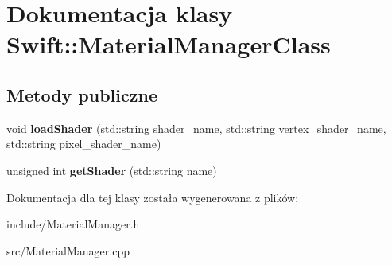 \hypertarget{class_swift_1_1_material_manager_class}{\section{Dokumentacja klasy Swift\-:\-:Material\-Manager\-Class}
\label{class_swift_1_1_material_manager_class}
}
\subsection*{Metody publiczne}
\begin{DoxyCompactItemize}
\item 
\hypertarget{class_swift_1_1_material_manager_class_aeb13a6288bf4966107bc7a7e31c80518}{void {\bfseries load\-Shader} (std\-::string shader\-\_\-name, std\-::string vertex\-\_\-shader\-\_\-name, std\-::string pixel\-\_\-shader\-\_\-name)}\label{class_swift_1_1_material_manager_class_aeb13a6288bf4966107bc7a7e31c80518}

\item 
\hypertarget{class_swift_1_1_material_manager_class_aeaee837ceb85f2453a231671549b3a93}{unsigned int {\bfseries get\-Shader} (std\-::string name)}\label{class_swift_1_1_material_manager_class_aeaee837ceb85f2453a231671549b3a93}

\end{DoxyCompactItemize}


Dokumentacja dla tej klasy została wygenerowana z plików\-:\begin{DoxyCompactItemize}
\item 
include/Material\-Manager.\-h\item 
src/Material\-Manager.\-cpp\end{DoxyCompactItemize}
